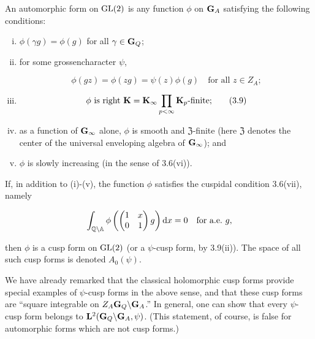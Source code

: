 \begin{definition}\label{def:3.3}

An automorphic form on $\operatorname{GL}(2)$ is any function $\phi$ on $\mathbf{G}_A$ satisfying the following conditions:

\begin{enumerate}[(i)]

\item $\phi(\gamma g) = \phi(g)$ for all $\gamma \in \mathbf{G}_Q$;

\item for some grossencharacter $\psi$,

\[
\phi(gz) = \phi(zg) = \psi(z)\phi(g) \quad \text{for all } z \in Z_A;
\]

\item

\begin{equation}\label{eq:3.9}
\phi \text{ is right } \mathbf{K} = \mathbf{K}_\infty\prod_{p<\infty}\mathbf{K}_p\text{-finite;}\tag{3.9}
\end{equation}

\item as a function of $\mathbf{G}_\infty$ alone, $\phi$ is smooth and $\mathfrak{Z}$-finite (here $\mathfrak{Z}$ denotes the center of the universal enveloping algebra of $\mathbf{G}_\infty$); and

\item $\phi$ is slowly increasing (in the sense of 3.6(vi)).

\end{enumerate}

\end{definition}

If, in addition to (i)-(v), the function $\phi$ satisfies the cuspidal condition 3.6(vii), namely

\[
\int_{\mathbb{Q}\backslash\mathbb{A}}\phi\left(\begin{pmatrix} 1 & x \\ 0 & 1 \end{pmatrix}g\right)\mathrm{d} x = 0 \quad \text{for a.e.\ } g,
\]

then $\phi$ is a cusp form on $\operatorname{GL}(2)$ (or a $\psi$-cusp form, by 3.9(ii)). The space of all such cusp forms is denoted $A_0(\psi)$.

We have already remarked that the classical holomorphic cusp forms provide special examples of $\psi$-cusp forms in the above sense, and that these cusp forms are ``square integrable on $Z_A\mathbf{G}_Q\backslash\mathbf{G}_A$.'' In general, one can show that every $\psi$-cusp form belongs to $\mathbf{L}^2(\mathbf{G}_Q\backslash\mathbf{G}_A,\psi)$. (This statement, of course, is false for automorphic forms which are not cusp forms.)

